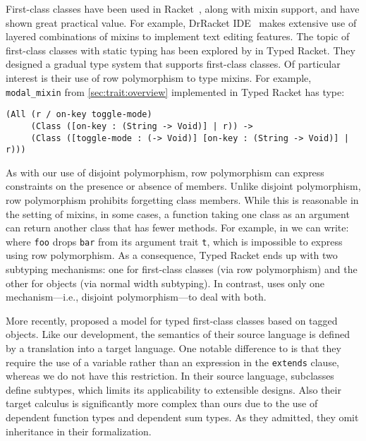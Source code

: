 First-class classes have been used in Racket~\citep{DBLP:conf/aplas/FlattFF06},
along with mixin support, and have shown great practical value. For example,
DrRacket IDE~\citep{DBLP:journals/jfp/FindlerCFFKSF02} makes extensive use of
layered combinations of mixins to implement text editing features. The topic of
first-class classes with static typing has been explored by
\citet{DBLP:conf/oopsla/TakikawaSDTF12} in Typed Racket. They designed a gradual
type system that supports first-class classes. Of particular interest is their
use of row polymorphism to type mixins. For example, \lstinline{modal_mixin}
from \cref{sec:trait:overview} implemented in Typed Racket has type:
\begin{lstlisting}
(All (r / on-key toggle-mode)
     (Class ([on-key : (String -> Void)] | r)) ->
     (Class ([toggle-mode : (-> Void)] [on-key : (String -> Void)] | r)))
\end{lstlisting}
As with our use of disjoint polymorphism, row polymorphism can express
constraints on the presence or absence of members. Unlike disjoint polymorphism,
row polymorphism prohibits forgetting class members. While this is reasonable in
the setting of mixins, in some cases, a function taking one class as an argument
can return another class that has fewer methods. For example, in \sedel we can write:
where \lstinline{foo} drops \lstinline{bar} from its argument trait
\lstinline{t}, which is impossible to express using row polymorphism. As a
consequence, Typed Racket ends up with two subtyping mechanisms: one for
first-class classes (via row polymorphism) and the other for objects (via normal
width subtyping). In contrast, \sedel uses only one mechanism---i.e., disjoint
polymorphism---to deal with both.


More recently, \citet{DBLP:conf/ecoop/LeeASP15} proposed a model for typed
first-class classes based on tagged objects. Like our development, the semantics
of their source language is defined by a translation into a target language. One
notable difference to \sedel is that they require the use of a variable rather
than an expression in the \lstinline{extends} clause, whereas we do not have
this restriction. In their source language, subclasses define subtypes, which
limits its applicability to extensible designs. Also their target calculus is
significantly more complex than ours due to the use of dependent function types
and dependent sum types. As they admitted, they omit inheritance in their
formalization.

